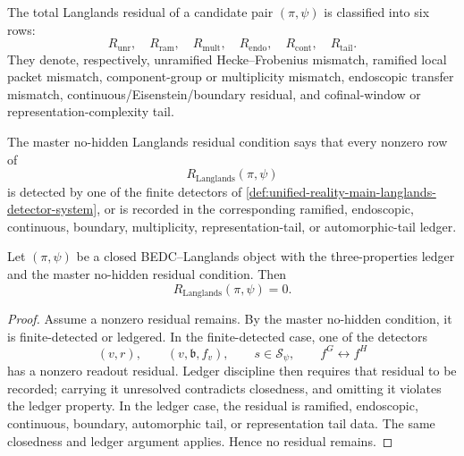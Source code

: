 \begin{definition}
\label{def:unified-reality-main-langlands-residual-ledger}
The total Langlands residual of a candidate pair $(\pi,\psi)$ is
classified into six rows:
$$
R_{\mathrm{unr}},\quad
R_{\mathrm{ram}},\quad
R_{\mathrm{mult}},\quad
R_{\mathrm{endo}},\quad
R_{\mathrm{cont}},\quad
R_{\mathrm{tail}}.
$$
They denote, respectively, unramified Hecke--Frobenius mismatch,
ramified local packet mismatch, component-group or multiplicity
mismatch, endoscopic transfer mismatch, continuous/Eisenstein/boundary
residual, and cofinal-window or representation-complexity tail.
\end{definition}

\begin{definition}
\label{def:unified-reality-master-no-hidden-langlands-residual}
The master no-hidden Langlands residual condition says that every
nonzero row of
$$
R_{\mathrm{Langlands}}(\pi,\psi)
$$
is detected by one of the finite detectors of
\autoref{def:unified-reality-main-langlands-detector-system}, or is
recorded in the corresponding ramified, endoscopic, continuous,
boundary, multiplicity, representation-tail, or automorphic-tail ledger.
\end{definition}

\begin{theorem}
\label{thm:unified-reality-main-no-hidden-excludes-wrong-packets}
Let $(\pi,\psi)$ be a closed BEDC--Langlands object with the
three-properties ledger and the master no-hidden residual condition.
Then
$$
R_{\mathrm{Langlands}}(\pi,\psi)=0.
$$
\end{theorem}
\begin{proof}
Assume a nonzero residual remains. By the master no-hidden condition,
it is finite-detected or ledgered. In the finite-detected case, one of
the detectors
$$
(v,r),\qquad (v,\mathfrak b,f_v),\qquad
s\in\mathcal S_\psi,\qquad f^G\leftrightarrow f^H
$$
has a nonzero readout residual. Ledger discipline then requires that
residual to be recorded; carrying it unresolved contradicts closedness,
and omitting it violates the ledger property. In the ledger case, the
residual is ramified, endoscopic, continuous, boundary, automorphic
tail, or representation tail data. The same closedness and ledger
argument applies. Hence no residual remains.
\end{proof}

